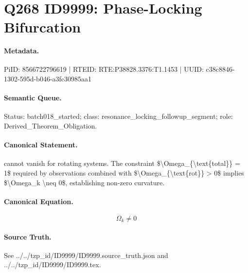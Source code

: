 \section*{Q268 ID9999: Phase-Locking Bifurcation}
\paragraph{Metadata.}
PiID: 8566722796619 | RTEID: RTE:P38828.3376:T1.1453 | UUID: c38c8846-1302-595d-b046-a3fc30985aa1

\paragraph{Semantic Queue.}
Status: batch018\_started; class: resonance\_locking\_followup\_segment; role: Derived\_Theorem\_Obligation.

\paragraph{Canonical Statement.}
cannot vanish for rotating systems. The constraint \$\textbackslash{}Omega\_\{\textbackslash{}text\{total\}\} = 1\$ required by observations combined with \$\textbackslash{}Omega\_\{\textbackslash{}text\{rot\}\} > 0\$ implies \$\textbackslash{}Omega\_k \textbackslash{}neq 0\$, establishing non-zero curvature.

\paragraph{Canonical Equation.}
\[
\Omega_k \neq 0
\]

\paragraph{Source Truth.}
See ../../tzp\_id/ID9999/ID9999.source\_truth.json and ../../tzp\_id/ID9999/ID9999.tex.
